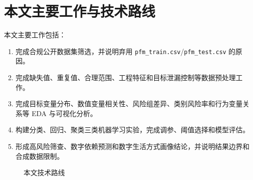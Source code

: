 \section{本文主要工作与技术路线}

本文主要工作包括：

\begin{enumerate}
  \item 完成合规公开数据集筛选，并说明弃用 \texttt{pfm\_train.csv}/\texttt{pfm\_test.csv} 的原因。
  \item 完成缺失值、重复值、合理范围、工程特征和目标泄漏控制等数据预处理工作。
  \item 完成目标变量分布、数值变量相关性、风险组差异、类别风险率和行为变量关系等 EDA 与可视化分析。
  \item 构建分类、回归、聚类三类机器学习实验，完成调参、阈值选择和模型评估。
  \item 形成高风险筛查、数字依赖预测和数字生活方式画像结论，并说明结果边界和合成数据限制。
\end{enumerate}

\begin{figure}[H]
\centering
{}
\caption{本文技术路线}
\label{fig:theme-pipeline}
\end{figure}
